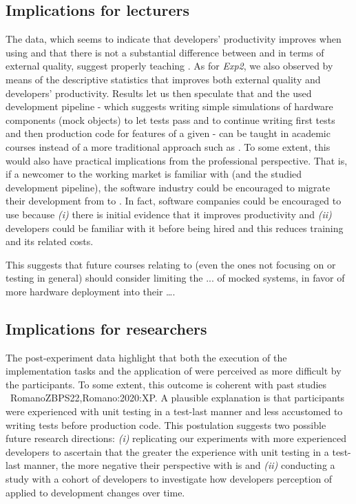 \subsection{Implications for lecturers} 
The data, which seems to indicate that developers' productivity improves when using \tdd and that there is not a substantial difference between \tdd and \notdd in terms of external quality, suggest properly teaching \tdd. 
As for \textit{Exp2}, we also observed by means of the descriptive statistics that \tdd improves both external quality and developers' productivity. 
Results let us then speculate that \tdd and the used development pipeline \cite{TDDEC}- which suggests writing simple simulations of hardware components (mock objects) to let tests pass and to continue writing first tests and then production code for features of a given \es - can be taught in academic \es courses instead of a more traditional approach such as \notdd. 
To some extent, this would also have practical implications from the professional perspective. That is, if a newcomer to the working market is familiar with \tdd (and the studied development pipeline), the software industry could be encouraged to migrate their development from \notdd to \tdd. In fact, software companies could be encouraged to use \tdd because \textit{(i)} there is initial evidence that it improves productivity and \textit{(ii)} developers could be familiar with it before being hired and this reduces training and its related costs.


This suggests that future courses relating to \ess (even the ones not focusing on \tdd or \ess testing in general) should consider limiting the ... of mocked systems, in favor of more hardware deployment into their \dots. 

\subsection{Implications for researchers} 
The post-experiment data highlight that both the execution of the implementation tasks and the application of \tdd were perceived as more difficult by the participants. 
To some extent, this outcome is coherent with past studies \eg~{RomanoZBPS22,Romano:2020:XP}. 
A plausible explanation is that participants were experienced with unit testing in a test-last manner and less accustomed to writing tests before production code. 
This postulation suggests two possible future research directions: \textit{(i)} replicating our experiments  with more experienced developers to ascertain that the greater the experience with unit testing in a test-last manner, the more negative their perspective with \tdd is and \textit{(ii)} conducting a study with a cohort of developers to investigate how developers perception of \tdd applied to \es development changes over time.


